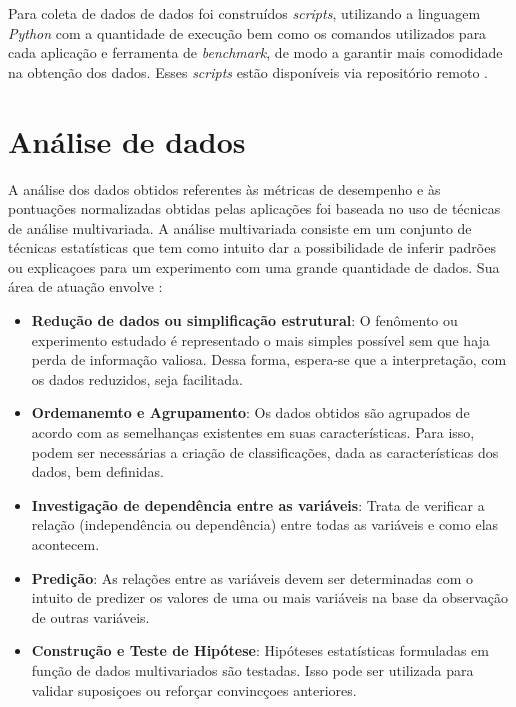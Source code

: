 Para coleta de dados de dados foi construídos \textit{scripts}, utilizando a linguagem \textit{Python} \footnotemark[13]                                                                                                                               com a quantidade de execução bem como os comandos utilizados para cada aplicação e ferramenta de \textit{benchmark}, de modo a garantir mais comodidade na obtenção dos dados. Esses \textit{scripts} estão disponíveis via repositório remoto \footnotemark[14].



\section{Análise de dados}

A análise dos dados obtidos referentes às métricas de desempenho e às pontuações normalizadas obtidas pelas aplicações foi baseada no uso de técnicas de análise multivariada. A análise multivariada consiste em um conjunto de técnicas estatísticas que tem como intuito dar a possibilidade de inferir padrões ou explicaçoes para um experimento com uma grande quantidade de dados. Sua área de atuação envolve \cite{johnson1988}:
\begin{itemize}
  \item \textbf{Redução de dados ou simplificação estrutural}: O fenômento ou experimento estudado é representado o mais simples possível sem que haja perda de informação valiosa. Dessa forma, espera-se que a interpretação, com os dados reduzidos, seja facilitada.
  
  \item \textbf{Ordemanemto e Agrupamento}: Os dados obtidos são agrupados de acordo com as semelhanças existentes em suas características. Para isso, podem ser necessárias a criação de classificações, dada as características dos dados, bem definidas.
  
  \item \textbf{Investigação de dependência entre as variáveis}: Trata de verificar a relação (independência ou dependência) entre todas as variáveis e como elas acontecem.
  
  \item \textbf{Predição}: As relações entre as variáveis devem ser determinadas com o intuito de predizer os valores de uma ou mais variáveis na base da observação de outras variáveis.
  
  \item \textbf{Construção e Teste de Hipótese}: Hipóteses estatísticas formuladas em função de dados multivariados são testadas. Isso pode ser utilizada para validar suposiçoes ou reforçar convincçoes anteriores.
\end{itemize}

